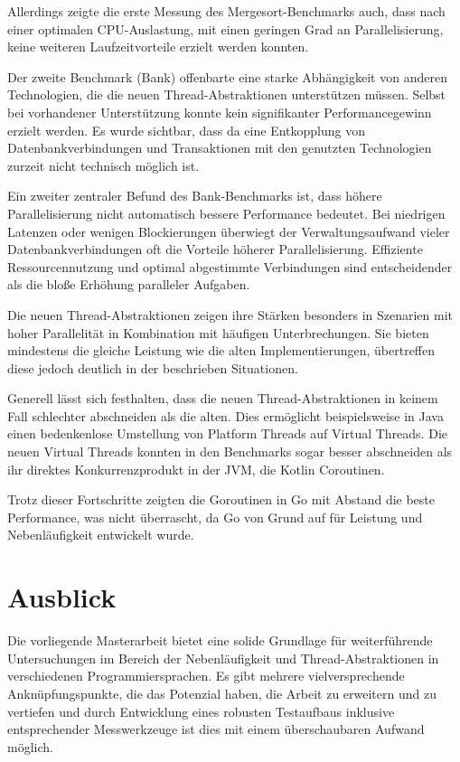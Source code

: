 \documentclass[fontsize=12pt,paper=a4,twoside=semi,parskip=half-,headsepline,headinclude]{scrreprt}
\begin{document}
Allerdings zeigte die erste Messung des Mergesort-Benchmarks auch, dass nach einer optimalen CPU-Auslastung, mit einen geringen Grad an Parallelisierung, keine weiteren Laufzeitvorteile erzielt werden konnten.

Der zweite Benchmark (Bank) offenbarte eine starke Abhängigkeit von anderen Technologien, die die neuen Thread-Abstraktionen unterstützen müssen. Selbst bei vorhandener Unterstützung konnte kein signifikanter Performancegewinn erzielt werden. Es wurde sichtbar, dass da eine Entkopplung von Datenbankverbindungen und Transaktionen mit den genutzten Technologien zurzeit nicht technisch möglich ist.

Ein zweiter zentraler Befund des Bank-Benchmarks ist, dass höhere Parallelisierung nicht automatisch bessere Performance bedeutet. Bei niedrigen Latenzen oder wenigen Blockierungen überwiegt der Verwaltungsaufwand vieler Datenbankverbindungen oft die Vorteile höherer Parallelisierung. Effiziente Ressourcennutzung und optimal abgestimmte Verbindungen sind entscheidender als die bloße Erhöhung paralleler Aufgaben.

Die neuen Thread-Abstraktionen zeigen ihre Stärken besonders in Szenarien mit hoher Parallelität in Kombination mit häufigen Unterbrechungen. Sie bieten mindestens die gleiche Leistung wie die alten Implementierungen, übertreffen diese jedoch deutlich in der beschrieben Situationen. 

Generell lässt sich festhalten, dass die neuen Thread-Abstraktionen in keinem Fall schlechter abschneiden als die alten. Dies ermöglicht beispielsweise in Java einen bedenkenlose Umstellung von Platform Threads auf Virtual Threads. Die neuen Virtual Threads konnten in den Benchmarks sogar besser abschneiden als ihr direktes Konkurrenzprodukt in der JVM, die Kotlin Coroutinen.

Trotz dieser Fortschritte zeigten die Goroutinen in Go mit Abstand die beste Performance, was nicht überrascht, da Go von Grund auf für Leistung und Nebenläufigkeit entwickelt wurde.


\section{Ausblick}

Die vorliegende Masterarbeit bietet eine solide Grundlage für weiterführende Untersuchungen im Bereich der Nebenläufigkeit und Thread-Abstraktionen in verschiedenen Programmiersprachen. Es gibt mehrere vielversprechende Anknüpfungspunkte, die das Potenzial haben, die Arbeit zu erweitern und zu vertiefen und durch Entwicklung eines robusten Testaufbaus inklusive entsprechender Messwerkzeuge ist dies mit einem überschaubaren Aufwand möglich.
\end{document}
